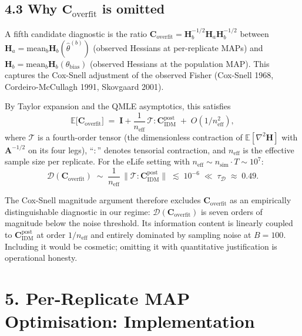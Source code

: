 \documentclass[11pt]{article}
\begin{document}
\subsection*{4.3 Why $\mathbf C_{\mathrm{overfit}}$ is omitted}

A fifth candidate diagnostic is the ratio
$\mathbf C_{\mathrm{overfit}} = \mathbf H_b^{-1/2}\mathbf H_a\mathbf H_b^{-1/2}$
between $\mathbf H_a = \mathrm{mean}_b\mathbf H_b(\widehat\theta^{(b)})$
(observed Hessians at per-replicate MAPs) and
$\mathbf H_b = \mathrm{mean}_b\mathbf H_b(\theta_{\mathrm{bias}})$
(observed Hessians at the population MAP). This captures the Cox-Snell
adjustment of the observed Fisher (Cox-Snell 1968,
Cordeiro-McCullagh 1991, Skovgaard 2001).

By Taylor expansion and the QMLE asymptotics, this satisfies
\begin{equation}
\mathbb E\bigl[\mathbf C_{\mathrm{overfit}}\bigr]
\;=\;
\mathbf I + \frac{1}{n_{\mathrm{eff}}}\,\mathcal T : \mathbf C_{\mathrm{IDM}}^{\mathrm{post}}
\;+\; O(1/n_{\mathrm{eff}}^2),
\label{eq:av-C-overfit-bias}
\end{equation}
where $\mathcal T$ is a fourth-order tensor (the dimensionless contraction
of $\mathbb E[\nabla^2\mathbf H]$ with $\mathbf A^{-1/2}$ on its four legs),
``$:$'' denotes tensorial contraction, and $n_{\mathrm{eff}}$ is the
effective sample size per replicate. For the eLife setting with
$n_{\mathrm{eff}} \sim n_{\mathrm{sim}}\cdot T \sim 10^7$:
\begin{equation}
\mathcal D(\mathbf C_{\mathrm{overfit}})
\;\sim\;
\frac{1}{n_{\mathrm{eff}}}\,\|\mathcal T : \mathbf C_{\mathrm{IDM}}^{\mathrm{post}}\|
\;\lesssim\;
10^{-6}
\;\ll\;
\tau_{\mathcal D}
\;\approx\; 0.49.
\label{eq:av-D-overfit-magnitude}
\end{equation}

The Cox-Snell magnitude argument therefore excludes
$\mathbf C_{\mathrm{overfit}}$ as an empirically distinguishable
diagnostic in our regime: $\mathcal D(\mathbf C_{\mathrm{overfit}})$ is
seven orders of magnitude below the noise threshold. Its information
content is linearly coupled to $\mathbf C_{\mathrm{IDM}}^{\mathrm{post}}$
at order $1/n_{\mathrm{eff}}$ and entirely dominated by sampling noise
at $B = 100$. Including it would be cosmetic; omitting it with
quantitative justification is operational honesty.

\section*{5. Per-Replicate MAP Optimisation: Implementation}
\label{sec:av-implementation}
\end{document}
